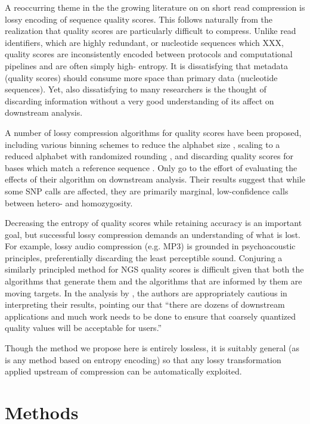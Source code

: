 \documentclass[twocolumn]{article}
\begin{document}
A reoccurring theme in the  the growing literature on on short read
compression is lossy encoding of sequence quality scores. This follows
naturally from the realization that quality scores are particularly difficult
to compress. Unlike read identifiers, which are highly redundant, or
nucleotide sequences which XXX, quality scores are inconsistently encoded
between protocols and computational pipelines and are often simply high-
entropy. It is dissatisfying that metadata (quality scores) should consume
more space than primary data (nucleotide sequences). Yet, also dissatisfying
to many researchers is the thought of discarding information without a very
good understanding of its affect on downstream analysis.

A number of lossy compression algorithms for quality scores have been
proposed, including various binning schemes to reduce the alphabet size
\citep{Wan2011}, scaling to a reduced alphabet with randomized rounding
\citep{Kozanitis2011}, and discarding quality scores for bases which match a
reference sequence \citep{Hsi-YangFritz2011}. Only \citet{Kozanitis2011} go to
the effort of evaluating the effects of their algorithm on downstream
analysis. Their results suggest that while some SNP calls are affected, they
are primarily marginal, low-confidence calls between hetero- and homozygosity.

Decreasing the entropy of quality scores while retaining accuracy is an
important goal, but successful lossy compression demands an understanding of
what is lost. For example, lossy audio compression (e.g. MP3) is grounded in
psychoacoustic principles, preferentially discarding the least perceptible
sound. Conjuring a similarly principled method for NGS quality scores is
difficult given that both the algorithms that generate them and the algorithms
that are informed by them are moving targets. In the analysis by
\citet{Kozanitis2011}, the authors are appropriately cautious in interpreting
their results, pointing our that ``there are dozens of downstream applications
and much work needs to be done to ensure that coarsely quantized quality
values will be acceptable for users.''



Though the method we propose here is entirely lossless, it is suitably general
(as is any method based on entropy encoding) so that any lossy transformation
applied upstream of compression can be automatically exploited.


\section{Methods}
\end{document}
